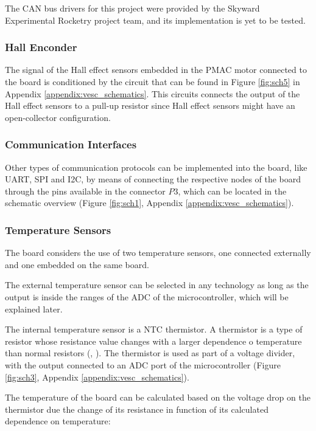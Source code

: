 The \ac{CAN} bus drivers for this project were provided by the Skyward Experimental Rocketry project team, and its implementation is yet to be tested.

\subsubsection{Hall Enconder}

The signal of the Hall effect sensors embedded in the \ac{PMAC} motor connected to the board is conditioned by the circuit that can be found in Figure \ref{fig:sch5} in Appendix \ref{appendix:vesc_schematics}. This circuits connects the output of the Hall effect sensors to a pull-up resistor since Hall effect sensors might have an open-collector configuration.

\subsubsection{Communication Interfaces}

Other types of communication protocols can be implemented into the board, like \acf{UART}, \acf{SPI} and \acf{I2C}, by means of connecting the respective nodes of the board through the pins available in the connector $P3$, which can be located in the schematic overview (Figure \ref{fig:sch1}, Appendix \ref{appendix:vesc_schematics}).

\subsubsection{Temperature Sensors}

The board considers the use of two temperature sensors, one connected externally and one embedded on the same board. 

The external temperature sensor can be selected in any technology as long as the output is inside the ranges of the \ac{ADC} of the microcontroller, which will be explained later.

The internal temperature sensor is a \acf{NTC} thermistor. A thermistor is a type of resistor whose resistance value changes with a larger dependence o temperature than normal resistors (\citeauthor{thermistor}, \citeyear{thermistor}). The thermistor is used as part of a voltage divider, with the output connected to an \ac{ADC} port of the microcontroller (Figure \ref{fig:sch3}, Appendix \ref{appendix:vesc_schematics}). 

The temperature of the board can be calculated based on the voltage drop on the thermistor due the change of its resistance in function of its calculated dependence on temperature:

